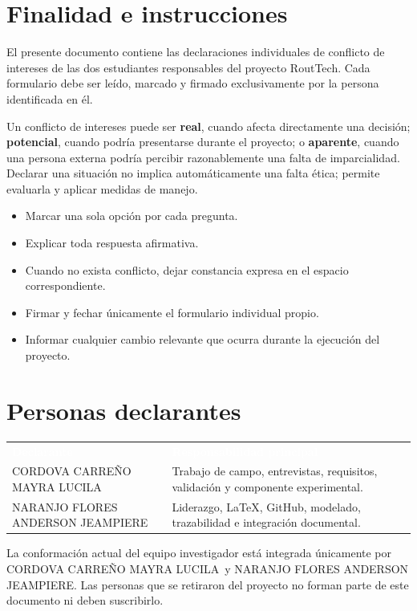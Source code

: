 \documentclass[10pt,a4paper]{article}
\newcommand{\Mayra}{CORDOVA CARREÑO MAYRA LUCILA}
\newcommand{\Anderson}{NARANJO FLORES ANDERSON JEAMPIERE}
\begin{document}
\section{Finalidad e instrucciones}

El presente documento contiene las declaraciones individuales de conflicto de intereses de las dos estudiantes responsables del proyecto RoutTech. Cada formulario debe ser leído, marcado y firmado exclusivamente por la persona identificada en él.

Un conflicto de intereses puede ser \textbf{real}, cuando afecta directamente una decisión; \textbf{potencial}, cuando podría presentarse durante el proyecto; o \textbf{aparente}, cuando una persona externa podría percibir razonablemente una falta de imparcialidad. Declarar una situación no implica automáticamente una falta ética; permite evaluarla y aplicar medidas de manejo.

\begin{itemize}
  \item Marcar una sola opción por cada pregunta.
  \item Explicar toda respuesta afirmativa.
  \item Cuando no exista conflicto, dejar constancia expresa en el espacio correspondiente.
  \item Firmar y fechar únicamente el formulario individual propio.
  \item Informar cualquier cambio relevante que ocurra durante la ejecución del proyecto.
\end{itemize}

\section{Personas declarantes}

\noindent{}
\begin{tabularx}{\textwidth}{L{5.2cm} Y}
\textcolor{white}{\textbf{Declarante}} & \textcolor{white}{\textbf{Responsabilidad principal}}\\
\Mayra & Trabajo de campo, entrevistas, requisitos, validación y componente experimental.\\
\Anderson & Liderazgo, LaTeX, GitHub, modelado, trazabilidad e integración documental.\\
\end{tabularx}

\vspace{0.45cm}
La conformación actual del equipo investigador está integrada únicamente por \Mayra\ y \Anderson. Las personas que se retiraron del proyecto no forman parte de este documento ni deben suscribirlo.
\end{document}
